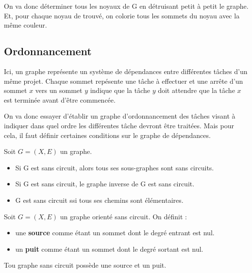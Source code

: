 On va donc déterminer tous les noyaux de G en détruisant petit à petit le graphe. 
Et, pour chaque noyau de trouvé, on colorie tous les sommets du noyau avec la même couleur. 


\subsection{Ordonnancement}

Ici, un graphe représente un système de dépendances entre différentes tâches d'un même projet. 
Chaque sommet repésente une tâche à effectuer et une arrête d'un sommet $x$ vers un sommet $y$ indique que 
la tâche $y$ doit attendre que la tâche $x$ est terminée avant d'être commencée. 

On va donc essayer d'établir un graphe d'ordonnancement des tâches visant à indiquer dans quel ordre les différentes 
tâche devront être traitées. Mais pour cela, il faut définir certaines conditions sur le graphe de dépendances. 

\begin{proposition}
    Soit $G = (X,E)$ un graphe. 
    \begin{itemize}
        \item Si G est sans circuit, alors tous ses sous-graphes sont sans circuits. 
        \item Si G est sans circuit, le graphe inverse de G est sans circuit. 
        \item G est sans circuit ssi tous ses chemins sont élémentaires. 
    \end{itemize}
\end{proposition}

\begin{definition}
    Soit $G = (X,E)$ un graphe orienté sans circuit. On définit :
    \begin{itemize}
        \item une \textbf{source} comme étant un sommet dont le degré entrant est nul. 
        \item un \textbf{puit} comme étant un sommet dont le degré sortant est nul. 
    \end{itemize}
\end{definition}

\begin{theorem}
    Tou graphe sans circuit possède une source et un puit. 
\end{theorem}

